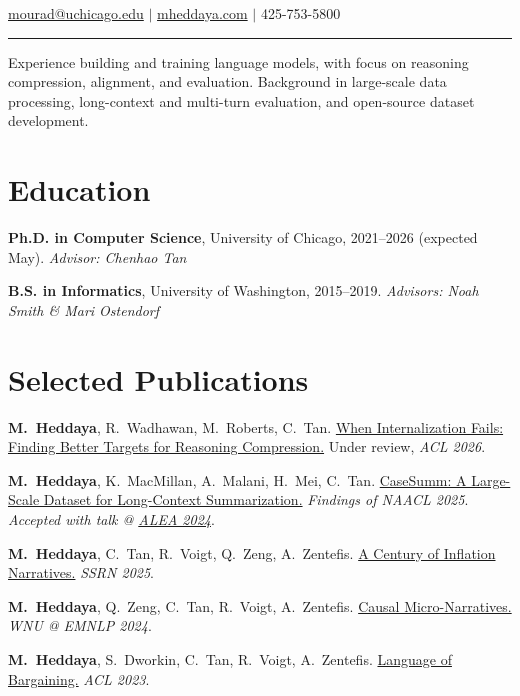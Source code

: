 \documentclass[11pt,letterpaper]{article}
\begin{document}
\hfill{\normalsize \href{mailto:mourad@uchicago.edu}{mourad@uchicago.edu} $|$ \href{https://mheddaya.com}{mheddaya.com} $|$ 425-753-5800}
\vspace{2pt}
\hrule

\vspace{12pt}
 Experience building and training language models, with focus on reasoning compression, alignment, and evaluation.
Background in large-scale data processing, long-context and multi-turn evaluation, and open-source dataset development.

\section*{Education}

\noindent\textbf{Ph.D. in Computer Science}, University of Chicago, 2021--2026 (expected May). \textit{Advisor: Chenhao Tan}

\vspace{4pt}

\noindent\textbf{B.S. in Informatics}, University of Washington, 2015--2019. \textit{Advisors: Noah Smith \& Mari Ostendorf}

\section*{Selected Publications}
\vspace{4pt}
\begin{enumerate}[label={[\arabic*]}, leftmargin=2em, topsep=2pt, itemsep=1pt, parsep=0pt]
    \item \textbf{M.\ Heddaya}, R.\ Wadhawan, M.\ Roberts, C.\ Tan. \href{https://mheddaya.com/papers/acl2026_abridge.pdf}{When Internalization Fails: Finding Better Targets for Reasoning Compression.} Under review, \textit{ACL 2026}.
    \item \textbf{M.\ Heddaya}, K.\ MacMillan, A.\ Malani, H.\ Mei, C.\ Tan. \href{https://arxiv.org/abs/2501.00097}{CaseSumm: A Large-Scale Dataset for Long-Context Summarization.} \textit{Findings of NAACL 2025}. \textit{Accepted with talk @ \href{https://www.amlecon.org}{ALEA 2024}}.
    \item \textbf{M.\ Heddaya}, C.\ Tan, R.\ Voigt, Q.\ Zeng, A.\ Zentefis. \href{https://papers.ssrn.com/sol3/papers.cfm?abstract_id=5259107}{A Century of Inflation Narratives.} \textit{SSRN 2025}.
    \item \textbf{M.\ Heddaya}, Q.\ Zeng, C.\ Tan, R.\ Voigt, A.\ Zentefis. \href{https://aclanthology.org/2024.wnu-1.12/}{Causal Micro-Narratives.} \textit{WNU @ EMNLP 2024}.
    \item \textbf{M.\ Heddaya}, S.\ Dworkin, C.\ Tan, R.\ Voigt, A.\ Zentefis. \href{https://aclanthology.org/2023.acl-long.735/}{Language of Bargaining.} \textit{ACL 2023}.
\end{enumerate}
\end{document}
